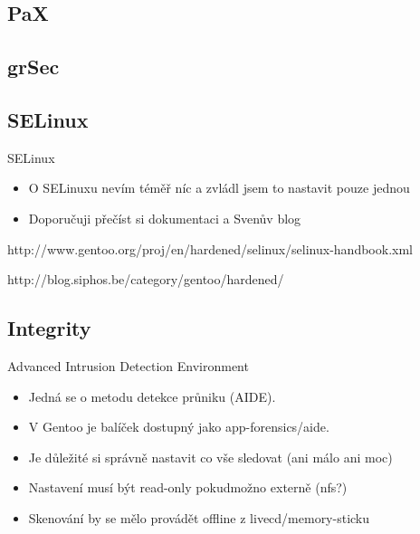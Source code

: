 \documentclass{beamer}
\begin{document}
\subsection{PaX}

\subsection{grSec}

\subsection{SELinux}

\begin{frame}{SELinux}
	\begin{itemize}
		\item O SELinuxu nevím téměř níc a zvládl jsem to nastavit pouze jednou
		\item Doporučuji přečíst si dokumentaci a Svenův blog
	\end{itemize}
	\begin{center}http://www.gentoo.org/proj/en/hardened/selinux/selinux-handbook.xml\end{center}
	\begin{center}http://blog.siphos.be/category/gentoo/hardened/\end{center}
\end{frame}

\subsection{Integrity}

\begin{frame}{Advanced Intrusion Detection Environment}
	\begin{itemize}
		\item Jedná se o metodu detekce průniku (AIDE).
		\item V Gentoo je balíček dostupný jako app-forensics/aide.
		\item Je důležité si správně nastavit co vše sledovat (ani málo ani moc)
		\item Nastavení musí být read-only pokudmožno externě (nfs?)
		\item Skenování by se mělo provádět offline z livecd/memory-sticku
	\end{itemize}
\end{frame}
\end{document}
